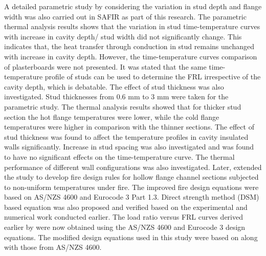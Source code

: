 A detailed parametric study by considering the variation in stud depth and flange width was also carried out in SAFIR as part of this research. The parametric thermal analysis results shows that the variation in stud time-temperature curves with increase in cavity depth/ stud width did not significantly change. This indicates that, the heat transfer through conduction in stud remains unchanged with increase in cavity depth. However, the time-temperature curves comparison of plasterboards were not presented. It was stated that the same time-temperature profile of studs can be used to determine the FRL irrespective of the cavity depth, which is debatable. The effect of stud thickness was also investigated. Stud thicknesses from 0.6 mm to 3 mm were taken for the parametric study. The thermal analysis results showed that for thicker stud section the hot flange temperatures were lower, while the cold flange temperatures were higher in comparison with the thinner sections. The effect of stud thickness was found to affect the temperature profiles in cavity insulated walls significantly. Increase in stud spacing was also investigated and was found to have no significant effects on the time-temperature curve. The thermal performance of different wall configurations was also investigated. Later, \citet{Kesawan2016} extended the study to develop fire design rules for hollow flange channel sections subjected to non-uniform temperatures under fire. The improved fire design equations were based on AS/NZS 4600 and Eurocode 3 Part 1.3. Direct strength method (DSM) based equation was also proposed and verified based on the experimental and numerical work conducted earlier. The load ratio versus FRL curves derived earlier by \citet{Kesawan2015a} were now obtained using the AS/NZS 4600 and Eurocode 3 design equations. The modified design equations used in this study were based on \citet{Gunalan2013a} along with those from AS/NZS 4600.  

